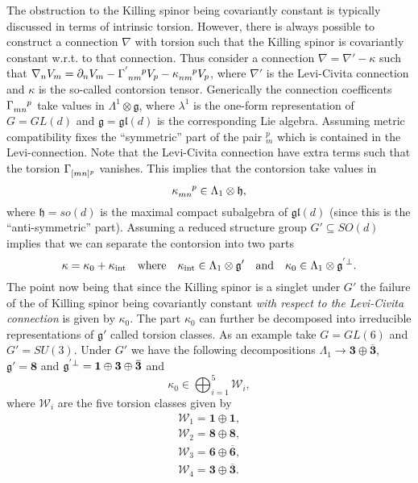 The obstruction to the Killing spinor being covariantly constant is typically discussed in terms of intrinsic torsion. However, there is always possible to construct a connection $\nabla$ with torsion such that the Killing spinor is covariantly constant w.r.t. to that connection. Thus consider a connection $\nabla=\nabla'-\kappa$ such that $\nabla_n V_m=\pd_nV_m-\tensor{\Gamma}{^'_{nm}^p}V_p-\tensor{\kappa}{_{nm}^p}V_p$, where $\nabla'$ is the Levi-Civita connection and $\kappa$ is the so-called contorsion tensor. Generically the connection coefficents $\tensor{\Gamma}{_{mn}^p}$ take values in $\Lambda^1\otimes\mathfrak{g}$, where $\lambda^1$ is the one-form representation of $G=GL(d)$ and $\mathfrak{g}=\mathfrak{gl}(d)$ is the corresponding Lie algebra. Assuming metric compatibility fixes the ``symmetric'' part of the pair $_m^p$ which is contained in the Levi-connection. Note that the Levi-Civita connection have extra terms such that the torsion $\tensor{\Gamma}{_{[mn]^p}}$ vanishes. This implies that the contorsion take values in 
\begin{equation}
    \tensor{\kappa}{_{mn}^p}\in \Lambda_1\otimes \mathfrak{h},
\end{equation}
where $\mathfrak{h}=so(d)$ is the maximal compact subalgebra of $\mathfrak{gl}(d)$ (since this is the ``anti-symmetric'' part). Assuming a reduced structure group $G'\subseteq SO(d)$ implies that we can separate the contorsion into two parts 
\begin{equation}
    \kappa = \kappa_0+\kappa_{\text{int}}\quad \text{where} \quad \kappa_{\text{int}}\in \Lambda_1\otimes \mathfrak{g}'\quad \text{and}\quad \kappa_{0}\in \Lambda_1\otimes \tensor{\mathfrak{g}}{^'^{\perp}}.
\end{equation}
The point now being that since the Killing spinor is a singlet under $G'$ the failure of the of Killing spinor being covariantly constant \emph{with respect to the Levi-Civita connection} is given by $\kappa_0$. The part $\kappa_0$ can further be decomposed into irreducible representations of $\mathfrak{g}'$ called torsion classes. As an example take $G=GL(6)$ and $G'=SU(3)$. Under $G'$ we have the following decompositions $\Lambda_1\to \mathbf{3}\oplus\overbar{\mathbf{3}}$, $\mathfrak{g}'=\mathbf{8}$ and $\tensor{\mathfrak{g}}{^'^{\perp}}=\mathbf{1}\oplus\mathbf{3}\oplus\overbar{\mathbf{3}}$ and 
\begin{equation}
    \kappa_0 \in \bigoplus_{i=1}^5 \mathscr{W}_i,
\end{equation}
where $\mathscr{W}_i$ are the five torsion classes given by 
\begin{align*}
    \mathscr{W}_1 = \mathbf{1}\oplus\mathbf{1},\\
    \mathscr{W}_2 = \mathbf{8}\oplus\mathbf{8},\\
    \mathscr{W}_3 = \mathbf{6}\oplus\overbar{\mathbf{6}},\\
    \mathscr{W}_4 = \mathbf{3}\oplus\overbar{\mathbf{3}}.\\
\end{align*}






